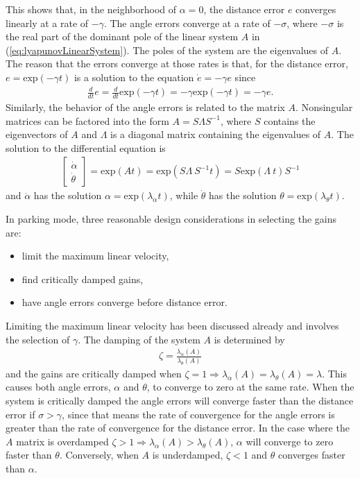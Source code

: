 This shows that, in the neighborhood of $\alpha=0$, the distance error $e$ converges linearly at a rate of $-\gamma$.
The angle errors converge at a rate of $-\sigma$, where $-\sigma$ is the real part of the dominant pole of the linear system $A$ in (\ref{eq:lyapunovLinearSystem}).
The poles of the system are the eigenvalues of $A$.
The reason that the errors converge at those rates is that, for the distance error, $e=\text{exp}(-\gamma t)$ is a solution to the equation $\dot{e}=-\gamma e$ since 
\begin{align*}
\tfrac{d}{dt}e=\tfrac{d}{dt}\text{exp}(-\gamma t) = -\gamma \text{exp}(-\gamma t)=-\gamma e.
\end{align*}
Similarly, the behavior of the angle errors is related to the matrix $A$.
Nonsingular matrices can be factored into the form $A=S\Lambda S^{-1}$, where $S$ contains the eigenvectors of $A$ and $\Lambda$ is a diagonal matrix containing the eigenvalues of $A$.
The solution to the differential equation is
\begin{align*}
\left[\begin{array}{c} \dot{\alpha} \\ \dot{\theta} \end{array}\right] = \text{exp} (At)=\text{exp} (S\Lambda~S^{-1}t)=S\text{exp} (\Lambda~t) S^{-1}
\end{align*}
and $\dot{\alpha}$ has the solution $\alpha=\text{exp}(\lambda_\alpha t)$, while $\dot{\theta}$ has the solution $\theta=\text{exp}(\lambda_\theta t)$.

In parking mode, three reasonable design considerations in selecting the gains are:
\begin{itemize}
\item limit the maximum linear velocity,
\item find critically damped gains,
\item have angle errors converge before distance error.
\end{itemize}
Limiting the maximum linear velocity has been discussed already and involves the selection of $\gamma$.
The damping of the system $A$ is determined by
\begin{align*}
\zeta = \frac{\lambda_\alpha(A)}{\lambda_\theta(A)}
\end{align*}
and the gains are critically damped when $\zeta = 1 \Rightarrow \lambda_\alpha(A)=\lambda_\theta(A)=\lambda$.
This causes both angle errors, $\alpha$ and $\theta$, to converge to zero at the same rate.
When the system is critically damped the angle errors will converge faster than the distance error if $\sigma>\gamma$, since that means the rate of convergence for the angle errors is greater than the rate of convergence for the distance error.
In the case where the $A$ matrix is overdamped $\zeta > 1 \Rightarrow \lambda_\alpha(A) > \lambda_\theta(A)$, $\alpha$ will converge to zero faster than $\theta$.
Conversely, when $A$ is underdamped, $\zeta < 1$ and $\theta$ converges faster than $\alpha$.


